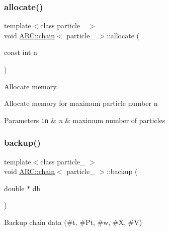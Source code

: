 \subsubsection{\texorpdfstring{allocate()}{allocate()}}
{\footnotesize\ttfamily template$<$class particle\+\_\+ $>$ \\
void \hyperlink{classARC_1_1chain}{A\+R\+C\+::chain}$<$ particle\+\_\+ $>$\+::allocate (\begin{DoxyParamCaption}\item[{const int}]{n }\end{DoxyParamCaption})\hspace{0.3cm}{\ttfamily [inline]}}



Allocate memory. 

Allocate memory for maximum particle number n 
\begin{DoxyParams}[1]{Parameters}
\mbox{\tt in}  & {\em n} & maximum number of particles \\
\hline
\end{DoxyParams}
\hypertarget{classARC_1_1chain_a3ad5d3a5a2e899ec55bd4aafaa18c2d2}{}\label{classARC_1_1chain_a3ad5d3a5a2e899ec55bd4aafaa18c2d2} 
\subsubsection{\texorpdfstring{backup()}{backup()}}
{\footnotesize\ttfamily template$<$class particle\+\_\+ $>$ \\
void \hyperlink{classARC_1_1chain}{A\+R\+C\+::chain}$<$ particle\+\_\+ $>$\+::backup (\begin{DoxyParamCaption}\item[{double $\ast$}]{db }\end{DoxyParamCaption})\hspace{0.3cm}{\ttfamily [inline]}}



Backup chain data (\#t, \#\+Pt, \#w, \#X, \#V) 

